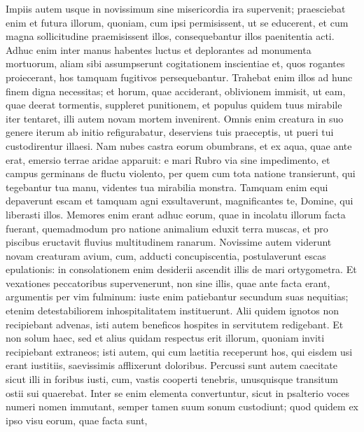 \begin{biblechapter}
\begin{biblechapter}
\begin{biblechapter}
\begin{biblechapter}
\begin{biblechapter}
\begin{biblechapter}
\begin{biblechapter}
\begin{biblechapter}
\begin{biblechapter}
\begin{biblechapter}
\begin{biblechapter}
\begin{biblechapter}
\begin{biblechapter}
\begin{biblechapter}
\begin{biblechapter}
\begin{biblechapter}
\begin{biblechapter}
\begin{biblechapter}
\begin{biblechapter}
\verse Impiis autem usque in novissimum sine misericordia ira supervenit;
 praesciebat enim et futura illorum, 
\verse quoniam, cum ipsi permisissent, ut se educerent,
 et cum magna sollicitudine praemisissent illos,
 consequebantur illos paenitentia acti.
 \verse Adhuc enim inter manus habentes luctus
 et deplorantes ad monumenta mortuorum,
 aliam sibi assumpserunt cogitationem inscientiae
 et, quos rogantes proiecerant,
 hos tamquam fugitivos persequebantur.
 \verse Trahebat enim illos ad hunc finem digna necessitas;
 et horum, quae acciderant, oblivionem immisit,
 ut eam, quae deerat tormentis, suppleret punitionem,
 \verse et populus quidem tuus mirabile iter tentaret,
 illi autem novam mortem invenirent.
 \verse Omnis enim creatura in suo genere iterum ab initio refigurabatur,
 deserviens tuis praeceptis,
 ut pueri tui custodirentur illaesi.
 \verse Nam nubes castra eorum obumbrans,
 et ex aqua, quae ante erat, emersio terrae aridae apparuit:
 e mari Rubro via sine impedimento,
 et campus germinans de fluctu violento,
 \verse per quem cum tota natione transierunt, qui tegebantur tua manu,
 videntes tua mirabilia monstra.
 \verse Tamquam enim equi depaverunt escam
 et tamquam agni exsultaverunt,
 magnificantes te, Domine, qui liberasti illos.
 \verse Memores enim erant adhuc eorum,
 quae in incolatu illorum facta fuerant,
 quemadmodum pro natione animalium eduxit terra muscas,
 et pro piscibus eructavit fluvius multitudinem ranarum.
 \verse Novissime autem viderunt novam creaturam avium,
 cum, adducti concupiscentia, postulaverunt escas epulationis:
 \verse in consolationem enim desiderii ascendit illis de mari ortygometra.
 \verse Et vexationes peccatoribus supervenerunt,
 non sine illis, quae ante facta erant, argumentis per vim fulminum:
 iuste enim patiebantur secundum suas nequitias;
 etenim detestabiliorem inhospitalitatem instituerunt.
 \verse Alii quidem ignotos non recipiebant advenas,
 isti autem beneficos hospites in servitutem redigebant.
 \verse Et non solum haec, sed et alius quidam respectus erit illorum,
 quoniam inviti recipiebant extraneos;
 \verse isti autem, qui cum laetitia receperunt hos,
 qui eisdem usi erant iustitiis,
 saevissimis afflixerunt doloribus.
 \verse Percussi sunt autem caecitate
 sicut illi in foribus iusti,
 cum, vastis cooperti tenebris,
 unusquisque transitum ostii sui quaerebat.
 \verse Inter se enim elementa convertuntur,
 sicut in psalterio voces numeri nomen immutant,
 semper tamen suum sonum custodiunt;
 quod quidem ex ipso visu eorum, quae facta sunt,

\end{biblechapter}
\end{biblechapter}
\end{biblechapter}
\end{biblechapter}
\end{biblechapter}
\end{biblechapter}
\end{biblechapter}
\end{biblechapter}
\end{biblechapter}
\end{biblechapter}
\end{biblechapter}
\end{biblechapter}
\end{biblechapter}
\end{biblechapter}
\end{biblechapter}
\end{biblechapter}
\end{biblechapter}
\end{biblechapter}
\end{biblechapter}
